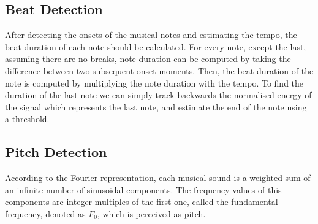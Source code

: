 \documentclass[conference]{IEEEtran}
\begin{document}
\subsection{Beat Detection}

After detecting the onsets of the musical notes and estimating the tempo, the beat duration of each note should be calculated.
For every note, except the last, assuming there are no breaks, note duration can be computed by taking the difference between two subsequent onset moments.
Then, the beat duration of the note is computed by multiplying the note duration with the tempo.
To find the duration of the last note we can simply track backwards the normalised energy of the signal which represents the last note, and estimate the end of the note using a threshold.

\subsection{Pitch Detection}

According to the Fourier representation, each musical sound is a weighted sum of an infinite number of sinusoidal components.
The frequency values of this components are integer multiples of the first one, called the fundamental frequency, denoted as $F_0$, which is perceived as pitch.
\end{document}
